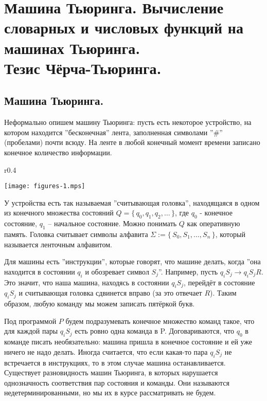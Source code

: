 \section[Машина Тьюринга. Вычисление словарных и числовых функций. Тезис Чёрча-Тьюринга.]{Машина Тьюринга.
Вычисление словарных и числовых функций на машинах Тьюринга.\\Тезис Чёрча-Тьюринга.}
\subsection*{Машина Тьюринга.}
\par Неформально опишем машину Тьюринга: пусть есть некоторое устройство, на
котором находится ''бесконечная'' лента, заполненная символами ''$\#$''
(пробелами) почти всюду.
На ленте в любой конечный момент времени записано конечное количество информации.

\begin{wrapfigure}{r}{0.4\textwidth}
	\begin{center}
		\texttt{[image: figures-1.mps]}
	\end{center}
\end{wrapfigure}

У устройства есть так называемая ''считывающая головка'',  находящаяся в одном из конечного множества
состояний $Q = \{\,q_0, q_1, q_2,\ldots\,\}$, где $q_0$ - конечное состояние, $q_1$ -- начальное
состояние. Можно понимать $Q$ как оперативную память. Головка считывает символы алфавита $\Sigma := \{\,S_0,
S_1,\ldots,S_n\,\}$, который называется ленточным алфавитом. 

Для машины есть ''инструкции'', которые говорят, что машине делать, когда ''она находится в состоянии $q_{i}$
и обозревает символ $S_j$''. Например, пусть $q_{i}S_j \to q_{i}S_jR$. Это значит, что наша машина,
находясь в состоянии $q_{i}S_j$, перейдёт в состояние $q_{i}S_j$ и считывающая головка сдвинется вправо (за это
отвечает $R$). Таким образом, любую команду мы можем записать пятёркой букв. 

Под программой $P$ будем подразумевать конечное множество команд такое, что для каждой пары $q_{i}S_j$ есть
ровно одна команда в P. Договариваются, что $q_{0}$ в команде писать необязательно: машина пришла в конечное
состояние и ей уже ничего не надо делать. Иногда считается, что если какая-то пара $q_{i}S_j$ не встречается в
инструкциях, то в этом случае машина останавливается. Существует  разновидность машин Тьюринга, в которых
нарушается однозначность соответствия пар состояния и команды. Они называются недетерминированными, но мы их в
курсе рассматривать не будем.

